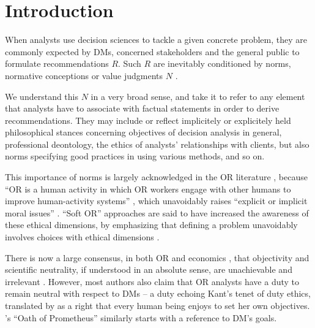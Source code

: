 \documentclass[preprint, french, english, 11pt, authoryear]{elsarticle}%
\begin{document}
\maketitle

\section{Introduction}
When analysts use decision sciences to tackle a given concrete problem, they are commonly expected by \acp{DM}, concerned stakeholders and the general public to formulate recommendations $R$. 
Such $R$ are inevitably conditioned by norms, normative conceptions or value judgments $N$ \citep{funtowicz_science_1993,brans_ethics_2002,mingers_ethics_2011}.
\begin{changebar}We understand this $N$ in a very broad sense, and take it to refer to any element that analysts have to associate with factual statements in order to derive recommendations. 
They may include or reflect implicitely or explicitely held philosophical stances concerning objectives of decision analysis in general, professional deontology, the ethics of analysts' relationships with clients, but also norms specifying good practices in using various methods, and so on.\end{changebar}

\begin{changebar}
This importance of norms is largely acknowledged in the \ac{OR} literature \citep{churchman_operations_1970,taket_undercover_1994,brans_ethics_2007,picavet_opportunities_2009}, 
because ``\ac{OR} is a human activity in which \ac{OR} workers engage with other humans to improve human-activity systems'' \citep{ormerod_operational_2013}, which unavoidably raises ``explicit or implicit moral issues'' \citep{diekmann_moral_2013}.
``Soft \ac{OR}'' approaches are said to have increased the awareness of these ethical dimensions, by emphasizing that defining a problem unavoidably involves choices with ethical dimensions \citep{ulrich_beyond_2003}.\end{changebar}

\begin{changebar}
There is now a large consensus, in both \ac{OR} and economics \citep{buchanan_positive_1959, sen_nature_1967, dwyer_scientific_1985, heath_value_1994, sen_rationality_2004, mongin_value_2006, sen_idea_2009, baujard_value_2013},
that objectivity and scientific neutrality, if understood in an absolute sense, are unachievable and irrelevant \citep{le_menestrel_ethics_2004,reisach_creation_2016}. However, most authors also claim that \ac{OR} analysts have a duty to remain neutral with respect to \acp{DM} 
-- a duty echoing Kant’s tenet of duty ethics, translated by \citet{reisach_creation_2016} as a right that every human being enjoys to set her own objectives.
\citet{gass_ethical_2009}'s ``Oath of Prometheus'' similarly starts with a reference to \ac{DM}'s goals.\end{changebar}
\end{document}
